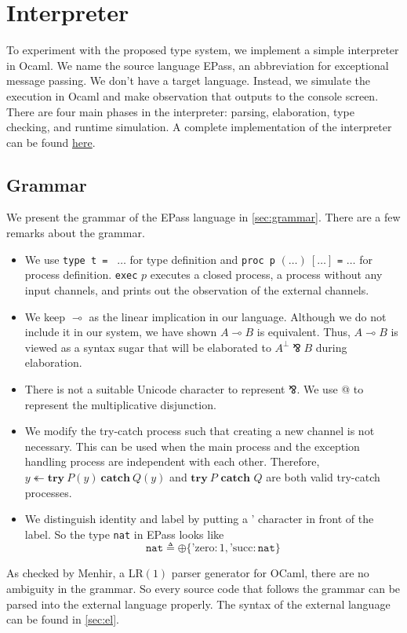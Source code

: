 \documentclass[12pt, openany]{memoir}
\newcommand*{\pare}[0]{\mathbin{\bindnasrepma}}
\newcommand*{\trycatch}[3]{#3 \twoheadleftarrow	\textbf{try}\ #1(#3)\ \textbf{catch}\ #2(#3)}
\begin{document}
\chapter{Interpreter}
To experiment with the proposed type system, we implement a simple interpreter in Ocaml. 
We name the source language EPass, an abbreviation for exceptional message passing. We don't have a target language.
Instead, we simulate the execution in Ocaml and make observation that outputs to the console screen.
There are four main phases in the interpreter: parsing, elaboration, type checking, and runtime simulation.
A complete implementation of the interpreter can be found \href{https://github.com/cekington/ePass}{here}.
\section{Grammar} 
We present the grammar of the EPass language in \cref{sec:grammar}. There are a few remarks about the grammar.
\begin{itemize}
  \item We use \texttt{type t = } $\ldots$ for type definition and \texttt{proc p} $(\ldots)\ [\ldots]$ \texttt{=} $\ldots$ for process definition.
  \texttt{exec} $p$ executes a closed process, a process without any input channels, and prints out the observation of the external channels. 
  \item We keep $\multimap$ as the linear implication in our language. Although we do not include it in our system, we have shown $A \multimap B$ is equivalent.
  Thus, $A \multimap B$ is viewed as a syntax sugar that will be elaborated to $A^\bot \pare B$ during elaboration.
  \item There is not a suitable Unicode character to represent $\pare$. We use @ to represent the multiplicative disjunction.
  \item We modify the try-catch process such that creating a new channel is not necessary. 
  This can be used when the main process and the exception handling process are independent with each other.
  Therefore, $\trycatch{P}{Q}{y}$ and $\textbf{try}\ P \textbf{ catch } Q$ are both valid try-catch processes.
  \item We distinguish identity and label by putting a ' character in front of the label. So the type \texttt{nat} in EPass looks like
  \[
    \texttt{nat} \triangleq \oplus\{\text{'zero} : 1 , \text{'succ} : \texttt{nat}\}
  \]
\end{itemize}
As checked by Menhir, a LR$(1)$ parser generator for OCaml, there are no ambiguity in the grammar.
So every source code that follows the grammar can be parsed into the external language properly.
The syntax of the external language can be found in \cref{sec:el}.
\end{document}
